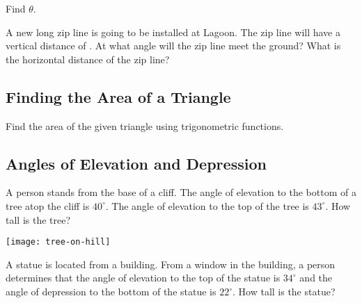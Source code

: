 \begin{exercise}
  Find \(\theta\).

  

\end{exercise}

\newpage

\begin{exercise}
  A new  long zip line is going to be installed at
  Lagoon. The zip line will have a vertical distance of .
  At what angle will the zip line meet the ground? What is the
  horizontal distance of the zip line?

\end{exercise}

\subsection{Finding the Area of a Triangle}%
\label{sub:area-triangle}

\begin{exercise}
  Find the area of the given triangle using trigonometric functions.

\end{exercise}

\newpage

\subsection{Angles of Elevation and Depression}%
\label{sub:angles-elevation-depression}

\begin{exercise}
  A person stands  from the base of a cliff. The angle
  of elevation to the bottom of a tree atop the cliff is
  \(40^{\circ}\). The angle of elevation to the top of the tree is
  \(43^{\circ}\). How tall is the tree?

  \texttt{[image: tree-on-hill]}

\end{exercise}

\begin{exercise}
  A statue is located  from a building. From a window
  in the building, a person determines that the angle of elevation to
  the top of the statue is \(34^{\circ}\) and the angle of depression
  to the bottom of the statue is \(22^{\circ}\). How tall is the
  statue?

\end{exercise}




